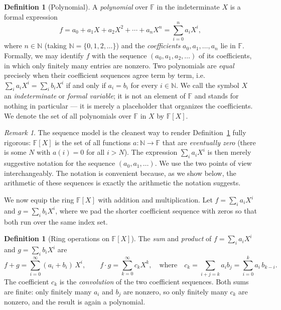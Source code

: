 \documentclass[11pt,a4paper]{article}
\theoremstyle{definition}
\newtheorem{definition}[theorem]{Definition}
\theoremstyle{remark}
\newtheorem{remark}[theorem]{Remark}
\newcommand{\N}{\ensuremath{\mathbb{N}}}
\newcommand{\F}{\ensuremath{\mathbb{F}}}
\begin{document}
\begin{definition}[Polynomial]\label{polynomials:def:polynomial}
A \emph{polynomial} over \(\F\) in the indeterminate \(X\) is a formal expression
\[
  f = a_0 + a_1 X + a_2 X^2 + \cdots + a_n X^n = \sum_{i=0}^{n} a_i X^i,
\]
where \(n \in \N\) (taking \(\N = \{0, 1, 2, \dots\}\)) and the
\emph{coefficients} \(a_0, a_1, \dots, a_n\) lie in \(\F\). Formally, we may
identify \(f\) with the sequence \((a_0, a_1, a_2, \dots)\) of its coefficients,
in which only finitely many entries are nonzero. Two polynomials are
\emph{equal} precisely when their coefficient sequences agree term by term,
i.e.\ \(\sum_i a_i X^i = \sum_i b_i X^i\) if and only if \(a_i = b_i\) for every
\(i \in \N\). We call the symbol \(X\) an \emph{indeterminate} or
\emph{formal variable}; it is not an element of \(\F\) and stands for nothing in
particular — it is merely a placeholder that organizes the coefficients. We denote the set
of all polynomials over \(\F\) in \(X\) by \(\F[X]\).
\end{definition}

\begin{remark}\label{polynomials:rem:sequence-model}
The sequence model is the cleanest way to render Definition~\ref{polynomials:def:polynomial}
fully rigorous: \(\F[X]\) is the set of all functions \(a \colon \N \to \F\) that
are \emph{eventually zero} (there is some \(N\) with \(a(i) = 0\) for all
\(i > N\)). The expression \(\sum_i a_i X^i\) is then merely suggestive notation
for the sequence \((a_0, a_1, \dots)\). We use the two
points of view interchangeably. The notation is convenient because, as we show below, the
arithmetic of these sequences is exactly the arithmetic the notation suggests.
\end{remark}

We now equip the ring \(\F[X]\) with addition and multiplication. Let
\(f = \sum_i a_i X^i\) and \(g = \sum_i b_i X^i\), where we pad the shorter
coefficient sequence with zeros so that both run over the same index set.

\begin{definition}[{Ring operations on \(\F[X]\)}]\label{polynomials:def:operations}
The \emph{sum} and \emph{product} of \(f = \sum_i a_i X^i\) and
\(g = \sum_i b_i X^i\) are
\[
  f + g = \sum_{i=0}^{\infty} (a_i + b_i)\, X^i,
  \qquad
  f \cdot g = \sum_{k=0}^{\infty} c_k X^k,
  \quad\text{where}\quad
  c_k = \sum_{i+j = k} a_i b_j = \sum_{i=0}^{k} a_i\, b_{k-i}.
\]
The coefficient \(c_k\) is the \emph{convolution} of the two coefficient
sequences. Both sums are finite: only finitely many \(a_i\) and \(b_j\) are
nonzero, so only finitely many \(c_k\) are nonzero, and the result is again a
polynomial.
\end{definition}
\end{document}

